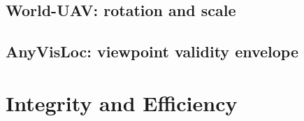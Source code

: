 \subsection{World-UAV: rotation and scale}
\label{sec:exp_worlduav}
\TBD{}

\subsection{AnyVisLoc: viewpoint validity envelope}
\label{sec:exp_anyvisloc}
\TBD{}

\section{Integrity and Efficiency}
\label{sec:efficiency}
\TBD{}

